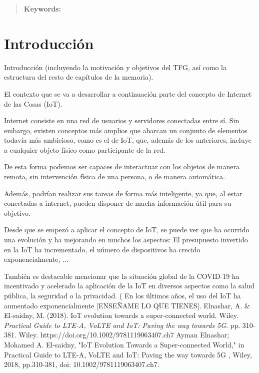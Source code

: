 \documentclass[12pt, a4paper, twoside]{article}
\begin{document}


\newpage

\begin{abstract}
    \blindtext[2]

	\bfseries{\large{Keywords:}}
\end{abstract}

\tableofcontents

\section{Introducción \\}
Introducción (incluyendo la motivación y objetivos del TFG, así como la estructura del resto de capítulos de la memoria).

El contexto que se va a desarrollar a continuación parte del concepto de Internet de las Cosas (IoT).

Internet consiste en una red de usuarios y servidores conectadas entre sí.
Sin embargo, existen conceptos más amplios que abarcan un conjunto de elementos todavía más ambicioso,
como es el de IoT, que, además de los anteriores, incluye a cualquier objeto físico como participante de la red.

De esta forma podemos ser capaces de interactuar con los objetos de manera remota, sin intervención física de
una persona, o de manera automática.

Además, podrían realizar sus tareas de forma más inteligente, ya que, al estar conectadas a internet, pueden
disponer de mucha información útil para su objetivo.

Desde que se empezó a aplicar el concepto de IoT, se puede ver que ha ocurrido una evolución y ha mejorando en
muchos los aspectos: El presupuesto invertido en la IoT ha incrementado, el número de dispositivos ha crecido
exponencialmente, ...

También es destacable mencionar que la situación global de la COVID-19 ha incentivado y acelerado la aplicación
de la IoT en diversos aspectos como la salud pública, la seguridad o la privacidad.
(
En los últimos años, el uso del IoT ha aumentado exponencialmente [ENSEÑAME LO QUE TIENES].
Elnashar, A. \& El-saidny, M. (2018). IoT evolution towards a super-connected world. Wiley. \textit{Practical Guide to LTE-A, VoLTE and IoT: Paving the way towards 5G}. pp. 310-381. Wiley. https://doi.org/10.1002/9781119063407.ch7
Ayman Elnashar; Mohamed A. El-saidny, "IoT Evolution Towards a Super‐connected World," in Practical Guide to LTE-A, VoLTE and IoT: Paving the way towards 5G , Wiley, 2018, pp.310-381, doi: 10.1002/9781119063407.ch7.
\end{document}

